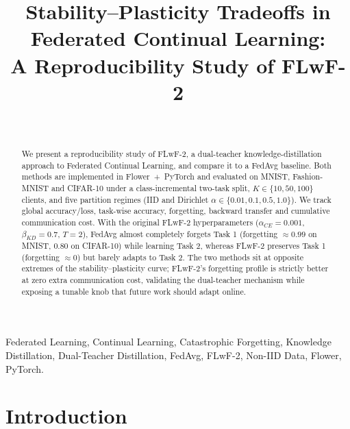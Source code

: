 \documentclass[journal]{IEEEtran}
\begin{document}
\title{Stability--Plasticity Tradeoffs in\\
Federated Continual Learning:\\
A Reproducibility Study of FLwF-2}

\author{
\\
}

\maketitle

\begin{abstract}
We present a reproducibility study of FLwF-2, a dual-teacher
knowledge-distillation approach to Federated Continual Learning, and
compare it to a FedAvg baseline. Both methods are implemented in
Flower~+~PyTorch and evaluated on MNIST, Fashion-MNIST and CIFAR-10
under a class-incremental two-task split, $K{\in}\{10,50,100\}$
clients, and five partition regimes (IID and Dirichlet
$\alpha{\in}\{0.01,0.1,0.5,1.0\}$). We track global accuracy/loss,
task-wise accuracy, forgetting, backward transfer and cumulative
communication cost. With the original FLwF-2 hyperparameters
($\alpha_{CE}{=}0.001$, $\beta_{KD}{=}0.7$, $T{=}2$), FedAvg almost
completely forgets Task 1 (forgetting $\approx 0.99$ on MNIST,
$0.80$ on CIFAR-10) while learning Task 2, whereas FLwF-2 preserves
Task 1 (forgetting $\approx 0$) but barely adapts to Task 2. The two
methods sit at opposite extremes of the stability--plasticity curve;
FLwF-2's forgetting profile is strictly better at zero extra
communication cost, validating the dual-teacher mechanism while
exposing a tunable knob that future work should adapt online.
\end{abstract}

\begin{IEEEkeywords}
Federated Learning, Continual Learning, Catastrophic Forgetting,
Knowledge Distillation, Dual-Teacher Distillation, FedAvg, FLwF-2,
Non-IID Data, Flower, PyTorch.
\end{IEEEkeywords}

\section{Introduction}
\label{sec:intro}
\end{document}
